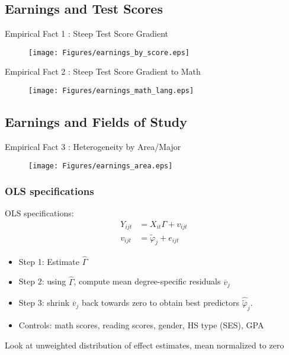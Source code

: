 \documentclass[table,10pt]{beamer}
\begin{document}
\subsection{Earnings and Test Scores}
\begin{frame}{Empirical Fact 1 : Steep Test Score Gradient }
\centering

\begin{figure}
  \centering
  \texttt{[image: Figures/earnings\_by\_score.eps]}

\end{figure}

\end{frame}
\begin{frame}{Empirical Fact 2 : Steep Test Score Gradient to Math }
\centering

\begin{figure}
  \centering
  \texttt{[image: Figures/earnings\_math\_lang.eps]}

\end{figure}

\end{frame}



\subsection{Earnings and Fields of Study}

\begin{frame}{Empirical Fact 3 : Heterogeneity by Area/Major  }

\centering
\begin{figure}
  \centering
  \texttt{[image: Figures/earnings\_area.eps]}

\end{figure}
\end{frame}

\begin{frame}
\frametitle{OLS specifications}

OLS specifications:
\begin{align}
Y_{ijt}&=X_{it} \Gamma+v_{ijt} \\
v_{ijt}&=\widetilde{\varphi}_{j}+e_{ijt} \nonumber
\end{align}
\vspace{-.2in}
\begin{itemize}
\item <1> Step 1: Estimate $\hat{\Gamma}$
\item<1> Step 2: using $\hat{\Gamma}$, compute mean degree-specific residuals $\overline{v}_{j}$
\item<1> Step 3: shrink $\overline{v}_{j}$ back towards zero to obtain best predictors $\widehat{\widetilde{\varphi}}_j$.
\item<1> Controls: math scores, reading scores, gender, HS type (SES), GPA
\end{itemize}

\medskip

Look at unweighted distribution of effect estimates, mean normalized to zero
\end{frame}
\end{document}
